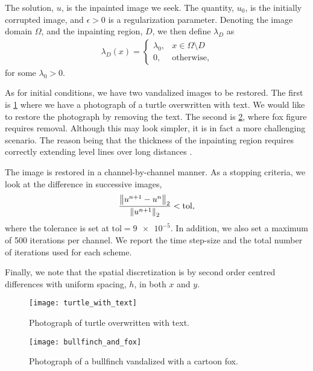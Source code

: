 The solution, $u$, is the inpainted image we seek. The quantity, $u_0$, is the initially corrupted image, and $\epsilon > 0$ is a regularization parameter. Denoting the image domain $\Omega$, and the inpainting region, $D$, we then define $\lambda_D$ as 
\begin{align}
\lambda_D(x)
= \begin{cases}
\lambda_0, & x\in \Omega\setminus D
\\
0, &\text{otherwise},
\end{cases}
\end{align}
for some $\lambda_0 > 0$.

As for initial conditions, we have two vandalized images to be restored. The first is \cref{fig:turtle with text} where we have a photograph of a turtle overwritten with text. We would like to restore the photograph by removing the text. The second is \cref{fig:bullfinch and fox}, where fox figure requires removal. Although this may look simpler, it is in fact a more challenging scenario. The reason being that the thickness of the inpainting region requires correctly extending level lines over long distances \cite{schonlieb2011unconditionally}.

The image is restored in a channel-by-channel manner. As a stopping criteria, we look at the difference in successive images, 
\begin{align}
        \frac{\left\lVert u^{n+1} - u^n\right\rVert_2}{\left\lVert u^{n+1}\right\rVert_2} < \mathrm{tol},
\end{align}
where the tolerance is set at $\mathrm{tol}=\num{9e-5}$.  In addition, we also set a maximum of 500 iterations per channel. We report the time step-size and the total number of iterations used for each scheme.

Finally, we note that the spatial discretization is by second order centred differences with uniform spacing, $h$, in both $x$ and $y$.
\begin{figure}[htb!]
        \centering 
\texttt{[image: turtle\_with\_text]}
\caption[Photograph of turtle overwritten with text.]{Photograph of turtle overwritten with text.}
\label{fig:turtle with text}
\end{figure}

\begin{figure}[htb!]
        \centering 
\texttt{[image: bullfinch\_and\_fox]}
\caption[Photograph of a bullfinch vandalized by a cartoonish fox.]{Photograph of a bullfinch vandalized with a cartoon fox.}
\label{fig:bullfinch and fox}
\end{figure}

